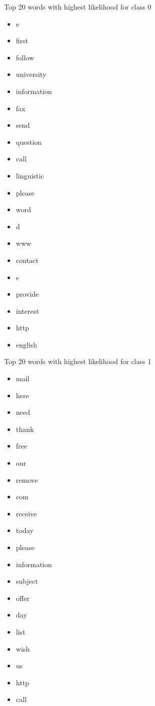 \begin{multicols*}{2}
Top 20 words with highest likelihood for class 0
\begin{itemize}
  \item e
  \item first
  \item follow
  \item university
  \item information
  \item fax
  \item send
  \item question
  \item call
  \item linguistic
  \item please
  \item word
  \item d
  \item www
  \item contact
  \item s
  \item provide
  \item interest
  \item http
  \item english
\end{itemize}

Top 20 words with highest likelihood for class 1
\begin{itemize}
  \item mail
  \item here
  \item need
  \item thank
  \item free
  \item our
  \item remove
  \item com
  \item receive
  \item today
  \item please
  \item information
  \item subject
  \item offer
  \item day
  \item list
  \item wish
  \item us
  \item http
  \item call
\end{itemize}
\end{multicols*}


